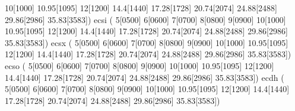 {                          10[1000] 10.95[1095] 12[1200] 14.4[1440] 
                          17.28[1728] 20.74[2074] 24.88[2488] 29.86[2986]
                          35.83[3583])
     \makefont ecsi   ( 5[0500] 6[0600] 7[0700] 8[0800] 9[0900] 
                          10[1000] 10.95[1095] 12[1200] 14.4[1440] 
                          17.28[1728] 20.74[2074] 24.88[2488] 29.86[2986]
                          35.83[3583])
     \makefont ecsx   ( 5[0500] 6[0600] 7[0700] 8[0800] 9[0900] 
                          10[1000] 10.95[1095] 12[1200] 14.4[1440] 
                          17.28[1728] 20.74[2074] 24.88[2488] 29.86[2986]
                          35.83[3583])
     \makefont ecso   ( 5[0500] 6[0600] 7[0700] 8[0800] 9[0900] 
                          10[1000] 10.95[1095] 12[1200] 14.4[1440] 
                          17.28[1728] 20.74[2074] 24.88[2488] 29.86[2986]
                          35.83[3583])
     \makefont ecdh   ( 5[0500] 6[0600] 7[0700] 8[0800] 9[0900] 
                          10[1000] 10.95[1095] 12[1200] 14.4[1440] 
                          17.28[1728] 20.74[2074] 24.88[2488] 29.86[2986] 
                          35.83[3583])
}
%
%
%
%
%
%
%
%
%
\def\BatchOutput#1{
      \BatchLine{$ MF "\string\mode=localfont; input #1"}
}
